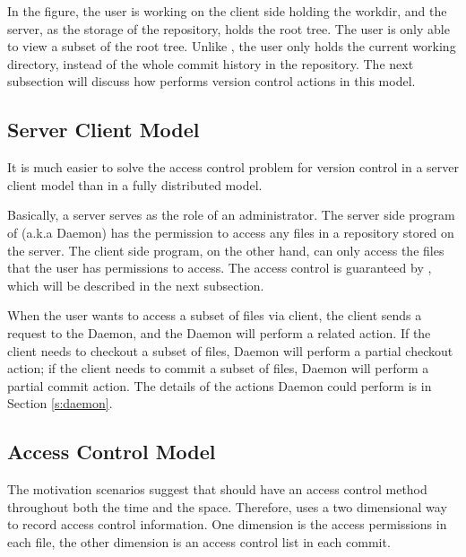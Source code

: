 In the figure, the user is working on the client side holding the workdir, and
the server, as the storage of the repository, holds the root tree. The user is
only able to view a subset of the root tree. Unlike \git, the user only holds the
current working directory, instead of the whole commit history in the
repository. The next subsection will discuss how \sys performs version control
actions in this model.

\subsection{Server Client Model}

It is much easier to solve the access control problem for version control in a
server client model than in a fully distributed model. 

Basically, a server serves as the role of an administrator. The server side
program of \sys (a.k.a \Sys Daemon) has the permission to access any files in a
repository stored on the server. The client side program, on the other hand, can
only access the files that the user has permissions to access.  The access control is
guaranteed by \sys, which will be described in the next subsection.

When the user wants to access a subset of files via \sys client, the client
sends a request to the \Sys Daemon, and the \Sys Daemon will perform a related
action. If the client needs to checkout a subset of files, \Sys Daemon will
perform a partial checkout action; if the client needs to commit a subset of
files, \Sys Daemon will perform a partial commit action. The details of the
actions \Sys Daemon could perform is in Section \ref{s:daemon}.

\subsection{Access Control Model}

The motivation scenarios suggest that \sys should have an access control method
throughout both the time and the space. 
Therefore, \sys uses a two dimensional  way to record
access control information. One dimension is the access permissions in each
file, the other dimension is an access control list in each commit.

